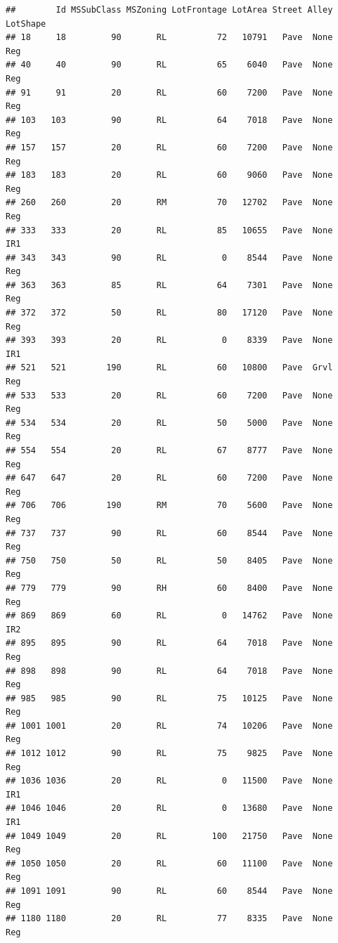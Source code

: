 \documentclass[]{article}
\begin{document}
\begin{verbatim}
##        Id MSSubClass MSZoning LotFrontage LotArea Street Alley LotShape
## 18     18         90       RL          72   10791   Pave  None      Reg
## 40     40         90       RL          65    6040   Pave  None      Reg
## 91     91         20       RL          60    7200   Pave  None      Reg
## 103   103         90       RL          64    7018   Pave  None      Reg
## 157   157         20       RL          60    7200   Pave  None      Reg
## 183   183         20       RL          60    9060   Pave  None      Reg
## 260   260         20       RM          70   12702   Pave  None      Reg
## 333   333         20       RL          85   10655   Pave  None      IR1
## 343   343         90       RL           0    8544   Pave  None      Reg
## 363   363         85       RL          64    7301   Pave  None      Reg
## 372   372         50       RL          80   17120   Pave  None      Reg
## 393   393         20       RL           0    8339   Pave  None      IR1
## 521   521        190       RL          60   10800   Pave  Grvl      Reg
## 533   533         20       RL          60    7200   Pave  None      Reg
## 534   534         20       RL          50    5000   Pave  None      Reg
## 554   554         20       RL          67    8777   Pave  None      Reg
## 647   647         20       RL          60    7200   Pave  None      Reg
## 706   706        190       RM          70    5600   Pave  None      Reg
## 737   737         90       RL          60    8544   Pave  None      Reg
## 750   750         50       RL          50    8405   Pave  None      Reg
## 779   779         90       RH          60    8400   Pave  None      Reg
## 869   869         60       RL           0   14762   Pave  None      IR2
## 895   895         90       RL          64    7018   Pave  None      Reg
## 898   898         90       RL          64    7018   Pave  None      Reg
## 985   985         90       RL          75   10125   Pave  None      Reg
## 1001 1001         20       RL          74   10206   Pave  None      Reg
## 1012 1012         90       RL          75    9825   Pave  None      Reg
## 1036 1036         20       RL           0   11500   Pave  None      IR1
## 1046 1046         20       RL           0   13680   Pave  None      IR1
## 1049 1049         20       RL         100   21750   Pave  None      Reg
## 1050 1050         20       RL          60   11100   Pave  None      Reg
## 1091 1091         90       RL          60    8544   Pave  None      Reg
## 1180 1180         20       RL          77    8335   Pave  None      Reg

\end{verbatim}
\end{document}
